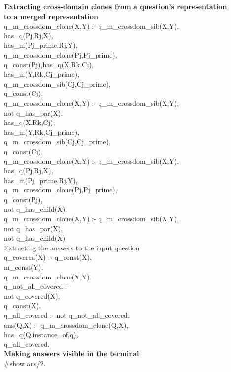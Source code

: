 \textbf{Extracting cross-domain clones from a question’s representation\\
to a merged representation}\\
q\_m\_crossdom\_clone(X,Y) :- q\_m\_crossdom\_sib(X,Y),\\
has\_q(Pj,Rj,X),\\
has\_m(Pj\_prime,Rj,Y),\\
q\_m\_crossdom\_clone(Pj,Pj\_prime),\\
q\_const(Pj),has\_q(X,Rk,Cj),\\
has\_m(Y,Rk,Cj\_prime),\\
q\_m\_crossdom\_sib(Cj,Cj\_prime),\\
q\_const(Cj).\\
q\_m\_crossdom\_clone(X,Y) :- q\_m\_crossdom\_sib(X,Y),\\
not q\_has\_par(X),\\
has\_q(X,Rk,Cj),\\
has\_m(Y,Rk,Cj\_prime),\\
q\_m\_crossdom\_sib(Cj,Cj\_prime),\\
q\_const(Cj).\\
q\_m\_crossdom\_clone(X,Y) :- q\_m\_crossdom\_sib(X,Y),\\
has\_q(Pj,Rj,X),\\
has\_m(Pj\_prime,Rj,Y),\\
q\_m\_crossdom\_clone(Pj,Pj\_prime),\\
q\_const(Pj),\\
not q\_has\_child(X).\\
q\_m\_crossdom\_clone(X,Y) :- q\_m\_crossdom\_sib(X,Y),\\
not q\_has\_par(X),\\
not q\_has\_child(X).\\
Extracting the answers to the input question\\
q\_covered(X) :- q\_const(X),\\
m\_const(Y),\\
q\_m\_crossdom\_clone(X,Y).\\
q\_not\_all\_covered :-\\
not q\_covered(X),\\
q\_const(X).\\
q\_all\_covered :- not q\_not\_all\_covered.\\
ans(Q,X) :- q\_m\_crossdom\_clone(Q,X),\\
has\_q(Q,instance\_of,q),\\
q\_all\_covered.\\

\textbf{Making answers visible in the terminal}\\
\#show ans/2.\\